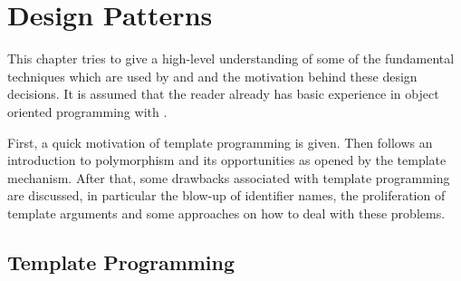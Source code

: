 \chapter{Design Patterns}
\label{chap:DesignPatterns}

This chapter tries to give a high-level understanding of some of the
fundamental techniques which are used by \Dune and \eWoms and the
motivation behind these design decisions. It is assumed that the
reader already has basic experience in object oriented programming
with \Cplusplus.

First, a quick motivation of \Cplusplus template programming is given. Then
follows an introduction to polymorphism and its opportunities as
opened by the template mechanism. After that, some drawbacks
associated with template programming are discussed, in particular the
blow-up of identifier names, the proliferation of template arguments
and some approaches on how to deal with these problems.

\section{\Cplusplus Template Programming}

